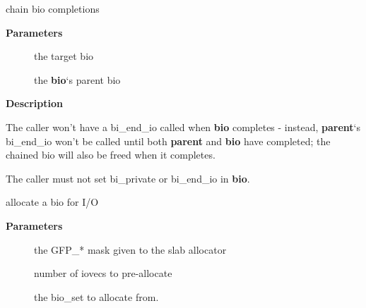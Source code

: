 \documentclass[a4paper,8pt,english]{sphinxmanual}
\begin{document}
\begin{fulllineitems}
\label{filesystems/index:c.bio_chain}
chain bio completions

\end{fulllineitems}


\textbf{Parameters}
\begin{description}
\item[{}] \leavevmode
the target bio

\item[{}] \leavevmode
the \textbf{bio}`s parent bio

\end{description}

\textbf{Description}

The caller won't have a bi\_end\_io called when \textbf{bio} completes - instead,
\textbf{parent}`s bi\_end\_io won't be called until both \textbf{parent} and \textbf{bio} have
completed; the chained bio will also be freed when it completes.

The caller must not set bi\_private or bi\_end\_io in \textbf{bio}.

\begin{fulllineitems}
\label{filesystems/index:c.bio_alloc_bioset}
allocate a bio for I/O

\end{fulllineitems}


\textbf{Parameters}
\begin{description}
\item[{}] \leavevmode
the GFP\_* mask given to the slab allocator

\item[{}] \leavevmode
number of iovecs to pre-allocate

\item[{}] \leavevmode
the bio\_set to allocate from.

\end{description}
\end{document}
